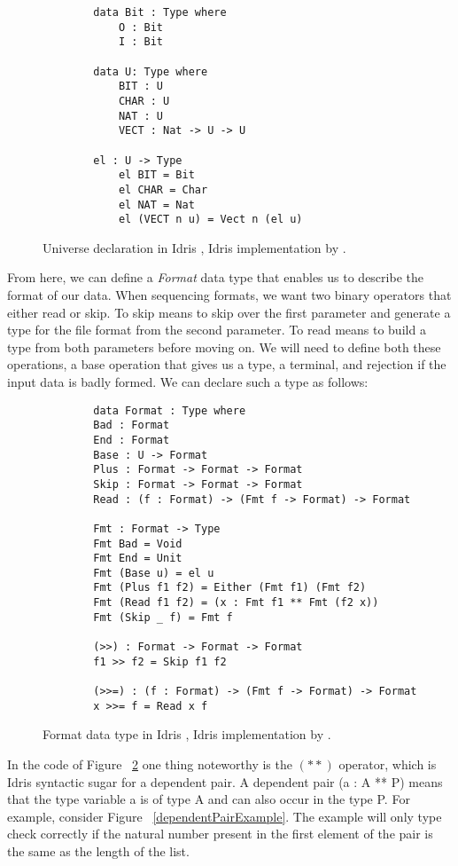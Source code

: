 \begin{figure}
    \caption{Universe declaration in Idris \cite{power_of_pi}, Idris implementation by \cite{idris_pop}.}
    \label{universe}
    \begin{lstlisting}
        data Bit : Type where
            O : Bit
            I : Bit

        data U: Type where
            BIT : U
            CHAR : U
            NAT : U
            VECT : Nat -> U -> U
        
        el : U -> Type
            el BIT = Bit
            el CHAR = Char
            el NAT = Nat
            el (VECT n u) = Vect n (el u) 
    \end{lstlisting}
\end{figure}

From here, we can define a \textit{Format} data type that enables us to describe
the format of our data. When sequencing formats, we want two binary operators
that either read or skip. To skip means to skip over the first parameter and
generate a type for the file format from the second parameter. To read means to
build a type from both parameters before moving on. We will need to define both
these operations, a base operation that gives us a type, a terminal, and
rejection if the input data is badly formed. We can declare such a type as
follows: 

\begin{figure}
    \caption{Format data type in Idris \cite{power_of_pi}, Idris implementation by \cite{idris_pop}.}
    \label{formatDeclaration}
    \begin{lstlisting}
        data Format : Type where
        Bad : Format
        End : Format
        Base : U -> Format
        Plus : Format -> Format -> Format
        Skip : Format -> Format -> Format
        Read : (f : Format) -> (Fmt f -> Format) -> Format

        Fmt : Format -> Type
        Fmt Bad = Void
        Fmt End = Unit
        Fmt (Base u) = el u
        Fmt (Plus f1 f2) = Either (Fmt f1) (Fmt f2)
        Fmt (Read f1 f2) = (x : Fmt f1 ** Fmt (f2 x))
        Fmt (Skip _ f) = Fmt f

        (>>) : Format -> Format -> Format
        f1 >> f2 = Skip f1 f2

        (>>=) : (f : Format) -> (Fmt f -> Format) -> Format
        x >>= f = Read x f
    \end{lstlisting}
\end{figure}

In the code of Figure ~\ref{formatDeclaration} one thing noteworthy is the
$(**)$ operator, which is Idris syntactic sugar for a dependent pair. A
dependent pair (a : A ** P) means that the type variable a is of type A and can
also occur in the type P. For example, consider Figure
~\ref{dependentPairExample}. The example will only type check correctly if the
natural number present in the first element of the pair is the same as the
length of the list. 

